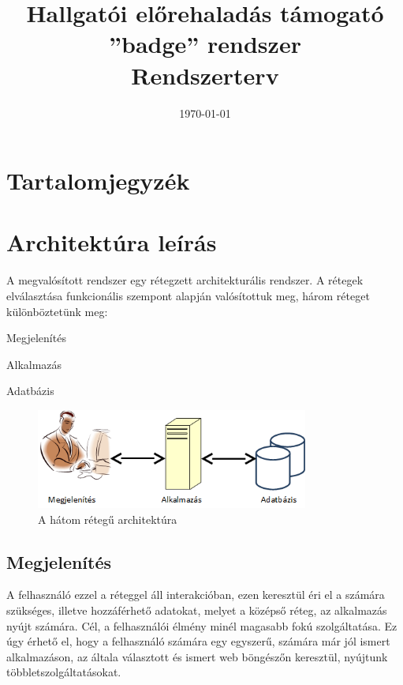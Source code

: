 \documentclass[a4paper,10pt,titlepage]{article}
\newcommand{\szerzo}{}
\newcommand{\cim}{Hallgatói előrehaladás támogató ''badge'' rendszer \\ Rendszerterv}
\newenvironment{sajat_itemize}
{
	\begin{itemize}
	\setlength{\itemsep}{0pt}
}
{
	\end{itemize}
}
\begin{document}


\begin{titlepage}

\title{\cim}
\author{\szerzo}
\date{\today}

\end{titlepage}
\maketitle

\section*{Tartalomjegyzék}
\makeatletter
{}
\makeatother

\newpage

\section{Architektúra leírás}
A megvalósított rendszer egy rétegzett architekturális rendszer. A rétegek elválasztása funkcionális szempont alapján valósítottuk meg, három réteget különböztetünk meg:

\begin{sajat_itemize}
\item Megjelenítés
\item Alkalmazás
\item Adatbázis
\end{sajat_itemize}

\begin{figure}[ht!]
\centering
\includegraphics[width=0.80\textwidth]{figures/3tier.png}
\caption{A hátom rétegű architektúra \label{fig:3tier}}
\end{figure}

\subsection{Megjelenítés}
A felhasználó ezzel a réteggel áll interakcióban, ezen keresztül éri el a számára szükséges, illetve hozzáférhető adatokat, melyet a középső réteg, az alkalmazás nyújt számára. Cél, a felhasználói élmény minél magasabb fokú szolgáltatása. Ez úgy érhető el, hogy a felhasználó számára egy egyszerű, számára már jól ismert alkalmazáson, az általa választott és ismert web böngészőn keresztül, nyújtunk többletszolgáltatásokat.
\end{document}
